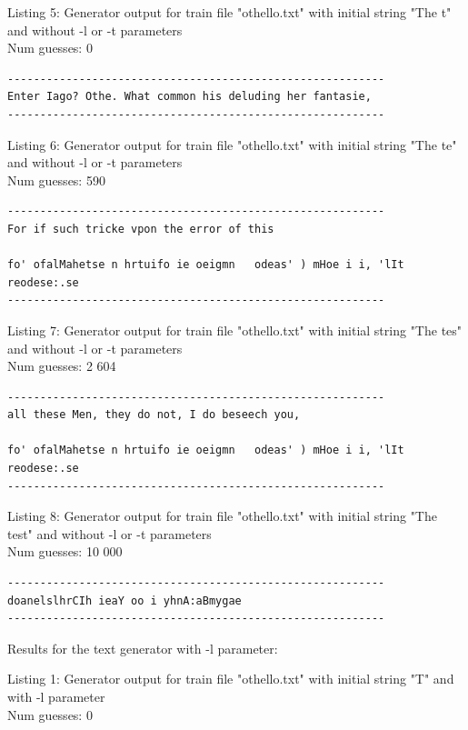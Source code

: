 \documentclass{article}
\begin{document}
Listing 5: Generator output for train file "othello.txt" with initial string "The t" and without -l or -t parameters
\\Num guesses: 0

\begin{lstlisting}
----------------------------------------------------------
Enter Iago? Othe. What common his deluding her fantasie,
----------------------------------------------------------
\end{lstlisting}

Listing 6: Generator output for train file "othello.txt" with initial string "The te" and without -l or -t parameters
\\Num guesses: 590

\begin{lstlisting}
----------------------------------------------------------
For if such tricke vpon the error of this

fo' ofalMahetse n hrtuifo ie oeigmn   odeas' ) mHoe i i, 'lIt reodese:.se
----------------------------------------------------------
\end{lstlisting}

Listing 7: Generator output for train file "othello.txt" with initial string "The tes" and without -l or -t parameters
\\Num guesses: 2 604

\begin{lstlisting}
----------------------------------------------------------
all these Men, they do not, I do beseech you,

fo' ofalMahetse n hrtuifo ie oeigmn   odeas' ) mHoe i i, 'lIt reodese:.se
----------------------------------------------------------
\end{lstlisting}

Listing 8: Generator output for train file "othello.txt" with initial string "The test" and without -l or -t parameters
\\Num guesses: 10 000

\begin{lstlisting}
----------------------------------------------------------
doanelslhrCIh ieaY oo i yhnA:aBmygae
----------------------------------------------------------
\end{lstlisting}



Results for the text generator with -l parameter:


\hfill

Listing 1: Generator output for train file "othello.txt" with initial string "T" and with -l parameter
\\Num guesses: 0
\end{document}
